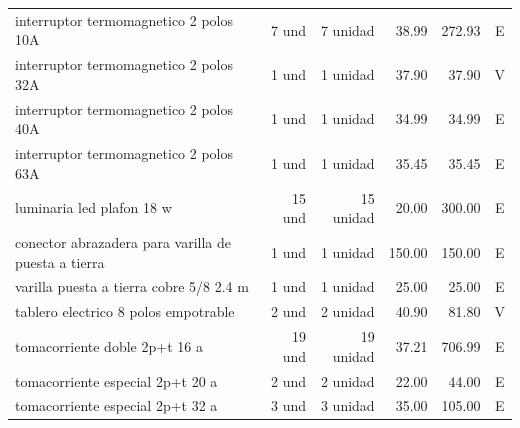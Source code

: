 \begin{longtable}{p{6.0cm}r r r r c}
interruptor termomagnetico 2 polos 10A & 7 und & 7 unidad & 38.99 & 272.93 & E \\
interruptor termomagnetico 2 polos 32A & 1 und & 1 unidad & 37.90 & 37.90 & V \\
interruptor termomagnetico 2 polos 40A & 1 und & 1 unidad & 34.99 & 34.99 & E \\
interruptor termomagnetico 2 polos 63A & 1 und & 1 unidad & 35.45 & 35.45 & E \\
luminaria led plafon 18 w & 15 und & 15 unidad & 20.00 & 300.00 & E \\
conector abrazadera para varilla de puesta a tierra & 1 und & 1 unidad & 150.00 & 150.00 & E \\
varilla puesta a tierra cobre 5/8 2.4 m & 1 und & 1 unidad & 25.00 & 25.00 & E \\
tablero electrico 8 polos empotrable & 2 und & 2 unidad & 40.90 & 81.80 & V \\
tomacorriente doble 2p+t 16 a & 19 und & 19 unidad & 37.21 & 706.99 & E \\
tomacorriente especial 2p+t 20 a & 2 und & 2 unidad & 22.00 & 44.00 & E \\
tomacorriente especial 2p+t 32 a & 3 und & 3 unidad & 35.00 & 105.00 & E \\
\bottomrule\end{longtable}\normalsize

